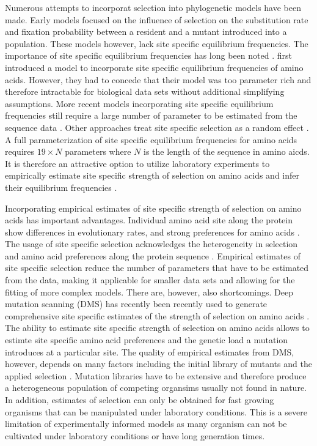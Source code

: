 Numerous attempts to incorporat selection into phylogenetic models have been made.
Early models focused on the influence of selection on the substitution rate and fixation probability between a resident and a mutant introduced into a population\citep{GoldmanAndYang1994, MuseAndGaut1994, thorne1996}.
These models however, lack site specific equilibrium frequencies.
The importance of site specific equilibrium frequencies has long been noted \citep{felsenstein1981, gojobori1983}.
\citet{HalpernAndBruno1998} first introduced a model to incorporate site specific equilibrium frequencies of amino acids.
However, they had to concede that their model was too parameter rich and therefore intractable for biological data sets without additional simplifying assumptions.
More recent models incorporating site specific equilibrium frequencies still require a large number of parameter to be estimated from the sequence data \citep{LartillotAndPhilippe2004,le2008,wang2008,holder2008,wu2013,tamuri2014}.
Other approaches treat site specific selection as a random effect \citep{rodrigue2010,rodrigue2013,rodrigue2014}.
A full parameterization of site specific equilibrium frequencies for amino acids requires $19\times N$ parameters where $N$ is the length of the sequence in amino aicds.
It is therefore an attractive option to utilize laboratory experiments to empirically estimate site specific strength of selection on amino acids and infer their equilibrium frequencies \citep{bloom2014, thyagarajan2014, bloom2017}.

Incorporating empirical estimates of site specific strength of selection on amino acids has important advantages.
Individual amino acid site along the protein show differences in evolutionary rates, and strong preferences for amino acids \citep{HalpernAndBruno1998, ashenberg2013, echave2016}.
The usage of site specific selection acknowledges the heterogeneity in selection and amino acid preferences along the protein sequence \citep{hilton2017}.
Empirical estimates of site specific selection reduce the number of parameters that have to be estimated from the data, making it applicable for smaller data sets and allowing for the fitting of more complex models.
There are, however, also shortcomings.
Deep mutation scanning (DMS) has recently been recently used to generate comprehensive site specific estimates of the strength of selection on amino acids \citep{Fowler2014}.
The ability to estimate site specific strength of selection on amino acids allows to estimte site specific amino acid preferences and the genetic load a mutation introduces at a particular site\citep{bloom2014,firnberg2014,stiffler2016}.
The quality of empirical estimates from DMS, however, depends on many factors including the initial library of mutants and the applied selection \citep{FirnbergAndOstermeier2012}.
Mutation libraries have to be extensive and therefore produce a heterogeneous population of competing organsims usually not found in nature.
In addition, estimates of selection can only be obtained for fast growing organisms that can be manipulated under laboratory conditions.
This is a severe limitation of experimentally informed models as many organism can not be cultivated under laboratory conditions or have long generation times.

